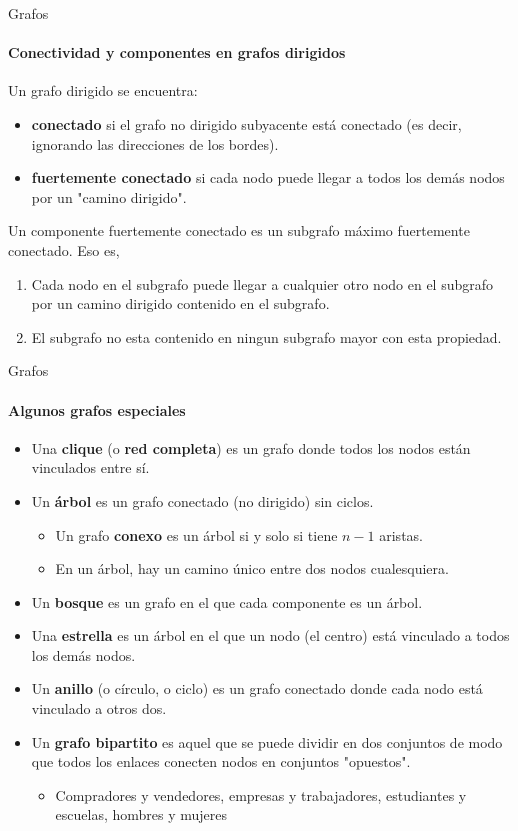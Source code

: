 \documentclass[11pt]{beamer}
\begin{document}
\begin{frame}{Grafos}
    \framesubtitle{Conectividad y componentes en grafos dirigidos}

Un grafo dirigido se encuentra:    
    \begin{itemize}
        \item \textbf{conectado} si el grafo no dirigido subyacente está conectado (es decir, ignorando las direcciones de los bordes).
        \item \textbf{fuertemente conectado} si cada nodo puede llegar a todos los demás nodos por un "camino dirigido".
            \end{itemize}

Un componente fuertemente conectado es un subgrafo máximo fuertemente conectado. Eso es,
\begin{enumerate}
\item  Cada nodo en el subgrafo puede llegar a cualquier otro nodo en el subgrafo por un camino dirigido contenido en el subgrafo.
\item El subgrafo no esta contenido en ningun subgrafo mayor con esta propiedad.
\end{enumerate}
\end{frame}

\begin{frame}{Grafos}
\framesubtitle{Algunos grafos especiales}
    \begin{itemize}
 \small       \item Una \textbf{clique} (o \textbf{red completa}) es un grafo donde todos los nodos están vinculados entre sí.
\item Un \textbf{árbol} es un grafo conectado (no dirigido) sin ciclos.
\begin{itemize}
\item Un grafo \textbf{conexo} es un árbol si y solo si tiene $n - 1$ aristas.
\item En un árbol, hay un camino único entre dos nodos cualesquiera.
\end{itemize}
\item Un \textbf{bosque} es un grafo en el que cada componente es un árbol.
\item Una \textbf{estrella} es un árbol en el que un nodo (el centro) está vinculado a todos los demás nodos.
\item Un \textbf{anillo} (o círculo, o ciclo) es un grafo conectado donde cada nodo está vinculado a otros dos.
\item Un \textbf{grafo bipartito} es aquel que se puede dividir en dos conjuntos de modo que todos los enlaces conecten nodos en conjuntos "opuestos".
\begin{itemize}
    \item Compradores y vendedores, empresas y trabajadores, estudiantes y escuelas, hombres y mujeres
\end{itemize}
    \end{itemize}
\end{frame}
\end{document}
